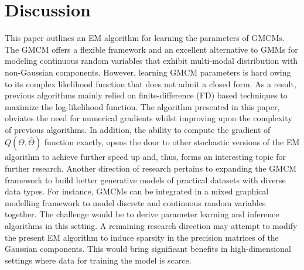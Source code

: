 \documentclass{article}
\theoremstyle{plain}
\theoremstyle{definition}
\theoremstyle{remark}
\begin{document}
\section{Discussion}\label{sec:Discussion}
This paper outlines an EM algorithm for learning the parameters of GMCMs. The GMCM offers a flexible framework and an excellent alternative to GMMs for modeling continuous random variables that exhibit multi-modal distribution with non-Gaussian components. However, learning GMCM parameters is hard owing to its complex likelihood function that does not admit a closed form. As a result, previous algorithms mainly relied on finite-difference (FD) based techniques to maximize the log-likelihood function. The algorithm presented in this paper, obviates the need for numerical gradients whilst improving upon the complexity of previous algorithms. In addition, the ability to compute the gradient of $Q(\Theta,\hat{\Theta})$ function exactly, opens the door to other stochastic versions of the EM algorithm to achieve further speed up and, thus, forms an interesting topic for further research. Another direction of research pertains to expanding the GMCM framework to build better generative models of practical datasets with diverse data types. For instance, GMCMs can be integrated in a mixed graphical modelling framework to model discrete and continuous random variables together. The challenge would be to derive parameter learning and inference algorithms in this setting. A remaining research direction may attempt to modify the present EM algorithm to induce sparsity in the precision matrices of the Gaussian components. This would bring significant benefits in high-dimensional settings where data for training the model is scarce. 








 

\end{document}

